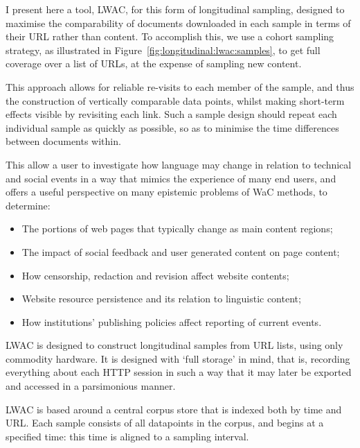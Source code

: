 I present here a tool, LWAC, for this form of longitudinal sampling, designed to maximise the comparability of documents downloaded in each sample in terms of their URL rather than content.  To accomplish this, we use a cohort sampling strategy, as illustrated in Figure~\ref{fig:longitudinal:lwac:samples}, to get full coverage over a list of URLs, at the expense of sampling new content.


This approach allows for reliable re-visits to each member of the sample, and thus the construction of vertically comparable data points, whilst making short-term effects visible by revisiting each link.  Such a sample design should repeat each individual sample as quickly as possible, so as to minimise the time differences between documents within.


This allow a user to investigate how language may change in relation to technical and social events in a way that mimics the experience of many end users, and offers a useful perspective on many epistemic problems of WaC methods, to determine:

\begin{itemize}
    \item The portions of web pages that typically change as main content regions;
        \vspace{-6pt}
    \item The impact of social feedback and user generated content on page content;
        \vspace{-6pt}
    \item How censorship, redaction and revision affect website contents;
        \vspace{-6pt}
    \item Website resource persistence and its relation to linguistic content;
        \vspace{-6pt}
    \item How institutions' publishing policies affect reporting of current events.
\end{itemize}

LWAC is designed to construct longitudinal samples from URL lists, using only commodity hardware.  It is designed with `full storage' in mind, that is, recording everything about each HTTP session in such a way that it may later be exported and accessed in a parsimonious manner.


LWAC is based around a central corpus store that is indexed both by time and URL\@.  Each sample consists of all datapoints in the corpus, and begins at a specified time: this time is aligned to a sampling interval.


